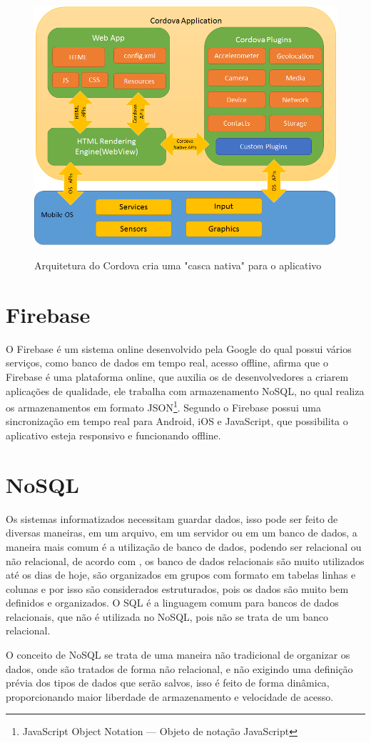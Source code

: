     \begin{figure}[H]
    	\centering
    	\caption{Arquitetura do Cordova cria uma "casca nativa" para o aplicativo} 
    	\includegraphics[width=0.6\linewidth]{Imagens/cordovaapparchitecture.png}
    	\label{fig:codova}
    \end{figure}


\section{Firebase}
    O Firebase é um sistema online desenvolvido pela Google do qual possui vários serviços, como banco de dados em tempo real, acesso offline,  afirma que o Firebase é uma plataforma online, que auxilia os de desenvolvedores a criarem aplicações de qualidade, ele trabalha com armazenamento NoSQL, no qual realiza os armazenamentos em formato JSON\footnote{JavaScript Object Notation — Objeto de notação JavaScript}. Segundo  o Firebase possui uma sincronização em tempo real para Android, iOS e JavaScript, que possibilita o aplicativo esteja responsivo e funcionando offline.

\section{NoSQL}
Os sistemas informatizados necessitam guardar dados, isso pode ser feito de diversas maneiras, em um arquivo, em um servidor ou em um banco de dados, a maneira mais comum é a utilização de banco de dados, podendo ser relacional ou não relacional, de acordo com , os banco de dados relacionais são muito utilizados até os dias de hoje,       são organizados em grupos com formato em tabelas linhas e colunas e por isso são considerados estruturados, pois os dados são muito bem definidos e organizados. O SQL é a linguagem comum para bancos de dados relacionais, que não é utilizada no NoSQL, pois não se trata de um banco relacional.

O conceito de NoSQL se trata de uma maneira não tradicional de organizar os dados, onde são tratados de forma não relacional, e não exigindo uma definição prévia dos tipos de dados que serão salvos, isso é feito de forma dinâmica, proporcionando maior liberdade de armazenamento e velocidade de acesso.